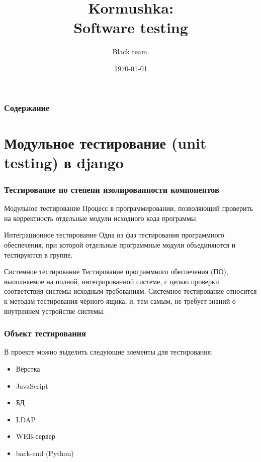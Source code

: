 \documentclass{beamer}
\title[Технологии разработки ПО]{Kormushka:\\Software testing}
\author{Black team.}
\institute[СПб ПУ]
{
Санкт-Петербургский государственный политехнический университет \\
\medskip
\textit{https://github.com/SemenMartynov/kormushka}
}
\date{\today}
\newlength{\wideitemsep}
\let\olditem\item
\renewcommand{\item}{\setlength{\itemsep}{\wideitemsep}\olditem}
\begin{document}
\begin{frame}
\titlepage
\end{frame}

\begin{frame}
\frametitle{Содержание}
\tableofcontents
\end{frame}

\section{Модульное тестирование (unit testing) в django}

\begin{frame}
\frametitle{Тестирование по степени изолированности компонентов}

\begin{block}{Модульное тестирование}
Процесс в программировании, позволяющий проверить на корректность отдельные модули исходного кода программы.
\end{block}

\begin{block}{Интеграционное тестирование}
Одна из фаз тестирования программного обеспечения, при которой отдельные программные модули объединяются и тестируются в группе.
\end{block}

\begin{block}{Системное тестирование}
Тестирование программного обеспечения (ПО), выполняемое на полной, интегрированной системе, с целью проверки соответствия системы исходным требованиям. Системное тестирование относится к методам тестирования чёрного ящика, и, тем самым, не требует знаний о внутреннем устройстве системы.
\end{block}

\end{frame}


\begin{frame}
\frametitle{Объект тестирования}

В проекте можно выделить следующие элементы для тестирования:
\begin{itemize}
\item Вёрстка
\item JavaScript
\item БД
\item LDAP
\item WEB-сервер
\item back-end (Python)
\end{itemize}

\end{frame}
\end{document}
